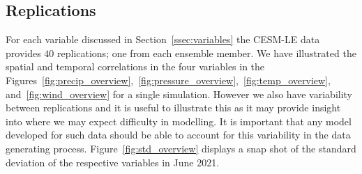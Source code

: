\subsection{Replications}
For each variable discussed in Section~\ref{ssec:variables} the CESM-LE data provides $40$ replications; one from each ensemble member.
We have illustrated the spatial and temporal correlations in the four variables in the Figures~\ref{fig:precip_overview},~\ref{fig:pressure_overview},~\ref{fig:temp_overview}, and~\ref{fig:wind_overview} for a single simulation.
However we also have variability between replications and it is useful to illustrate this as it may provide insight into where we may expect difficulty in modelling.
It is important that any model developed for such data should be able to account for this variability in the data generating process.
Figure~\ref{fig:std_overview} displays a snap shot of the standard deviation of the respective variables in June 2021.

